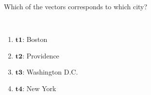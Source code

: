 Which of the vectors corresponds to which city?

\begin{solution}\ \\

\begin{enumerate}
    \item $\boldsymbol{t1}$: Boston
    \item $\boldsymbol{t2}$: Providence
    \item $\boldsymbol{t3}$: Washington D.C.
    \item $\boldsymbol{t4}$: New York
\end{enumerate}
\end{solution}